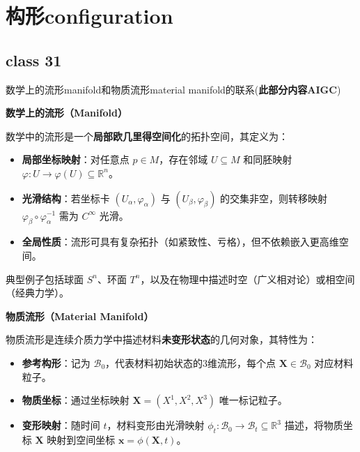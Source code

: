 \documentclass[12pt, a4paper, oneside, UTF8]{ctexbook}  %
\begin{document}
\else
\fi
\chapter{构形configuration}
\section{class 31}
\begin{add}
数学上的流形manifold和物质流形material manifold的联系(\textbf{此部分内容AIGC})

\begin{center}
    \textbf{数学上的流形（Manifold）}
\end{center}
数学中的流形是一个\textbf{局部欧几里得空间化}的拓扑空间，其定义为：
\begin{itemize}
  \item \textbf{局部坐标映射}：对任意点 \( p \in M \)，存在邻域 \( U \subseteq M \) 和同胚映射 \( \varphi: U \to \varphi(U) \subseteq \mathbb{R}^n \)。
  \item \textbf{光滑结构}：若坐标卡 \( (U_\alpha, \varphi_\alpha) \) 与 \( (U_\beta, \varphi_\beta) \) 的交集非空，则转移映射 \( \varphi_\beta \circ \varphi_\alpha^{-1} \) 需为 \( C^\infty \) 光滑。
  \item \textbf{全局性质}：流形可具有复杂拓扑（如紧致性、亏格），但不依赖嵌入更高维空间。
\end{itemize}
\noindent 典型例子包括球面 \( S^n \)、环面 \( T^n \)，以及在物理中描述时空（广义相对论）或相空间（经典力学）。

\begin{center}
    \textbf{物质流形（Material Manifold）}
\end{center}
物质流形是连续介质力学中描述材料\textbf{未变形状态}的几何对象，其特性为：
\begin{itemize}
  \item \textbf{参考构形}：记为 \( \mathcal{B}_0 \)，代表材料初始状态的3维流形，每个点 \( \mathbf{X} \in \mathcal{B}_0 \) 对应材料粒子。
  \item \textbf{物质坐标}：通过坐标映射 \( \mathbf{X} = (X^1, X^2, X^3) \) 唯一标记粒子。
  \item \textbf{变形映射}：随时间 \( t \)，材料变形由光滑映射 \( \phi_t: \mathcal{B}_0 \to \mathcal{B}_t \subseteq \mathbb{R}^3 \) 描述，将物质坐标 \( \mathbf{X} \) 映射到空间坐标 \( \mathbf{x} = \phi(\mathbf{X}, t) \)。
\end{itemize}


\end{add}
\end{document}
